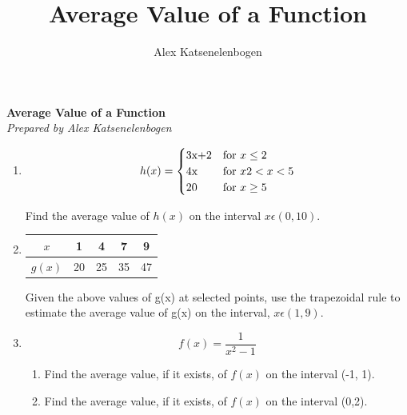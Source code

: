 \documentclass{article}
\title{Average Value of a Function}
\author{Alex Katsenelenbogen}
\begin{document}
\begin{center}
      \Large\textbf{Average Value of a Function}\\
      \large\textit{Prepared by Alex Katsenelenbogen}
   \end{center}

\begin{enumerate}


\item 
\vspace{0.4cm}
\begin{equation*}
h(x) = \begin{cases}
$3x+2$ &\text{for $x \leq 2$}\\
$4x$ &\text{for $x2 < x < 5$}\\
$20$ &\text{for $ x \geq 5$}\\
\end{cases}
\end{equation*}

Find the average value of $h(x)$ on the interval $x \epsilon (0,10)$.

\vspace{0.3cm}

\item

\begin{table}[htbp]
\centering
\begin{tabular}[t]{| c | c | c | c | c |}
        \hline
        $x$  & 1 & 4 & 7 & 9 \\
        \hline
        $g(x)$ & 20 & 25 & 35 & 47 \\
        \hline
\end{tabular} 
\end{table}
Given the above values of g(x) at selected points, use the trapezoidal rule to estimate the average value of g(x) on the 
interval, $x \epsilon (1, 9)$.
\vspace{0.3cm} \\

\item 
\begin{equation}
f(x) = \frac{1}{x^2 -1}
\end{equation}
\begin{enumerate}
\item Find the average value, if it exists, of $f(x)$ on the interval (-1, 1).
\item Find the average value, if it exists, of $f(x)$ on the interval (0,2).
\vspace{0.3cm}
\end{enumerate}


\end{enumerate}
\end{document}
